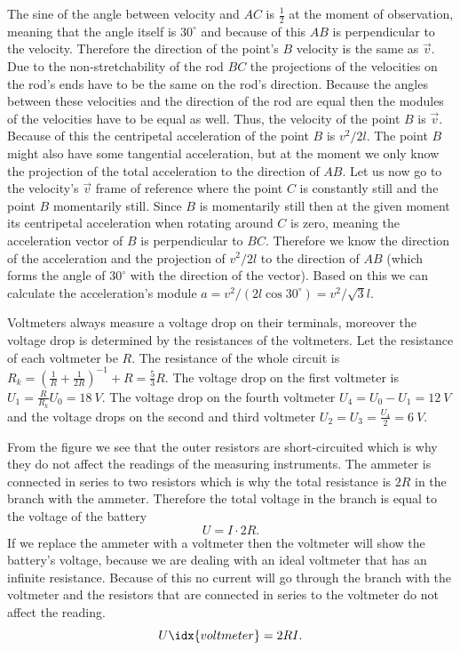 \documentclass[11pt]{article}
\begin{document}
\solueng
The sine of the angle between velocity and $AC$ is $\frac 12$ at the moment of observation, meaning that the angle itself is $30^\circ$ and because of this $AB$ is perpendicular to the velocity. Therefore the direction of the point’s $B$ velocity is the same as $\vec v$. Due to the non-stretchability of the rod $BC$ the projections of the velocities on the rod’s ends have to be the same on the rod’s direction. Because the angles between these velocities and the direction of the rod are equal then the modules of the velocities have to be equal as well. Thus, the velocity of the point $B$ is $\vec v$. Because of this the centripetal acceleration of the point $B$ is $v^2/2l$. The point $B$ might also have some tangential acceleration, but at the moment we only know the projection of the total acceleration to the direction of $AB$. Let us now go to the velocity’s $\vec v$ frame of reference where the point $C$ is constantly still and the point $B$ momentarily still. Since $B$ is momentarily still then at the given moment its centripetal acceleration when rotating around $C$ is zero, meaning the acceleration vector of $B$ is perpendicular to $BC$. Therefore we know the direction of the acceleration and the projection of $v^2/2l$ to the direction of $AB$ (which forms the angle of $30^\circ$ with the direction of the vector). Based on this we can calculate the acceleration’s module $a=v^2/(2l\cos30^\circ)=v^2/\sqrt 3l$.
\probend
\bigskip


\solueng
Voltmeters always measure a voltage drop on their terminals, moreover the voltage drop is determined by the resistances of the voltmeters. Let the resistance of each voltmeter be $R$. The resistance of the whole circuit is $R_k=\left(\frac{1}{R}+\frac{1}{2R}\right)^{-1}+R=\frac{5}{3}R$. The voltage drop on the first voltmeter is $U_1=\frac{R}{R_k}U_0=\SI{18}{V}$. The voltage drop on the fourth voltmeter $U_4=U_0-U_1=\SI{12}{V}$ and the voltage drops on the second and third voltmeter $U_2=U_3=\frac{U_4}{2}=\SI{6}{V}$.
\probend
\bigskip


\solueng
From the figure we see that the outer resistors are short-circuited which is why they do not affect the readings of the measuring instruments. The ammeter is connected in series to two resistors which is why the total resistance is $2R$ in the branch with the ammeter. Therefore the total voltage in the branch is equal to the voltage of the battery
\[ U = I\cdot 2R.\] 
If we replace the ammeter with a voltmeter then the voltmeter will show the battery’s voltage, because we are dealing with an ideal voltmeter that has an infinite resistance. Because of this no current will go through the branch with the voltmeter and the resistors that are connected in series to the voltmeter do not affect the reading.
\[ U\idx{voltmeter} = 2RI.\]
\probend
\bigskip
\end{document}
